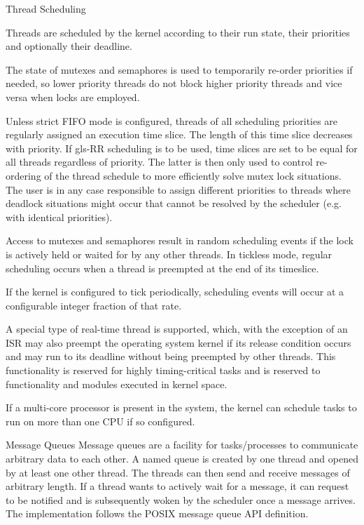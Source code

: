 %
{Thread Scheduling}{%
Threads are scheduled by the kernel according to their run state, their
priorities and optionally their deadline.\newline

The state of mutexes and semaphores is used to temporarily re-order priorities if
needed, so lower priority threads do not block higher priority threads and vice
versa when locks are employed.\newline

Unless strict \gls{FIFO} mode is configured, threads of all scheduling
priorities are regularly assigned an execution time slice. The length of this
time slice decreases with priority. If \gls{gls-RR} scheduling is to be used,
time slices are set to be equal for all threads regardless of priority.
The latter is then only used to control re-ordering of the thread schedule to
more efficiently solve mutex lock situations. The user is in any case
responsible to assign different priorities to threads where deadlock situations
might occur that cannot be resolved by the scheduler (e.g. with identical
priorities).\newline

Access to mutexes and semaphores result in random scheduling events if the lock
is actively held or waited for by any other threads.
In tickless mode, regular scheduling occurs when a thread is preempted at the
end of its timeslice.\newline

If the kernel is configured to tick periodically, scheduling events will occur
at a configurable integer fraction of that rate.\newline

A special type of real-time thread is supported, which, with the exception of
an \gls{ISR} may also preempt the operating system kernel if its release
condition occurs and may run to its deadline without being preempted by other
threads. This functionality is reserved for highly timing-critical tasks and 
is reserved to functionality and modules executed in kernel space.\newline


If a multi-core processor is present in the system, the kernel can schedule
tasks to run on more than one \gls{CPU} if so configured.

}%
{}{}


%
{Message Queues}{%
Message queues are a facility for tasks/processes to communicate arbitrary 
data to each other. A named queue is created by one thread and opened by at
least one other thread. The threads can then send and receive messages
of arbitrary length. If a thread wants to actively wait for a message, it can
request to be notified and is subsequently woken by the scheduler once a message
arrives.
}%
{}{The implementation follows the \gls{POSIX} message
queue \gls{API} definition.}


